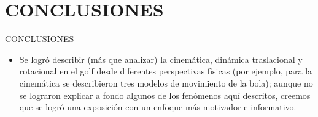 \section{CONCLUSIONES}
\begin{frame}{CONCLUSIONES}
\begin{itemize}
\item Se logró describir (más que analizar) la cinemática, dinámica traslacional y rotacional en el golf desde diferentes perspectivas físicas (por ejemplo, para la cinemática se describieron tres modelos de movimiento de la bola); aunque no se lograron explicar a fondo algunos de los fenómenos aquí descritos, creemos que se logró una exposición con un enfoque más motivador e informativo.
\end{itemize}
\end{frame}